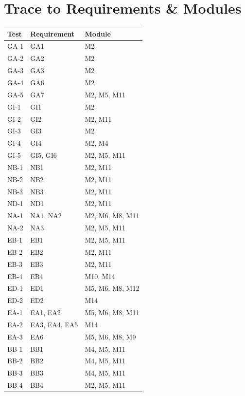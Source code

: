 \documentclass[12pt, titlepage]{article}
\begin{document}
\section{Trace to Requirements \& Modules}

\begin{longtable}{| p{} | p{} | p{}|}
  \hline
  Test & Requirement & Module\\
  \hline
  GA-1 & GA1 & M2\\
  \hline
  GA-2 & GA2 & M2\\
  \hline
  GA-3 & GA3 & M2\\
  \hline
  GA-4 & GA6 & M2\\
  \hline
  GA-5 & GA7 & M2, M5, M11\\
  \hline
  GI-1 & GI1 & M2\\
  \hline
  GI-2 & GI2 & M2, M11\\
  \hline
  GI-3 & GI3 & M2\\
  \hline
  GI-4 & GI4 & M2, M4\\
  \hline
  GI-5 & GI5, GI6 & M2, M5, M11\\
  \hline
  NB-1 & NB1 & M2, M11\\
  \hline
  NB-2 & NB2 & M2, M11\\
  \hline
  NB-3 & NB3 & M2, M11\\
  \hline
  ND-1 & ND1 & M2, M11\\
  \hline
  NA-1 & NA1, NA2 & M2, M6, M8, M11\\
  \hline
  NA-2 & NA3 & M2, M5, M11\\
  \hline
  EB-1 & EB1 & M2, M5, M11\\
  \hline
  EB-2 & EB2 & M2, M11\\
  \hline
  EB-3 & EB3 & M2, M11\\
  \hline
  EB-4 & EB4 & M10, M14\\
  \hline
  ED-1 & ED1 & M5, M6, M8, M12\\
  \hline
  ED-2 & ED2 & M14\\
  \hline
  EA-1 & EA1, EA2 & M5, M6, M8, M11\\
  \hline
  EA-2 & EA3, EA4, EA5 & M14\\
  \hline
  EA-3 & EA6 & M5, M6, M8, M9\\
  \hline
  BB-1 & BB1 & M4, M5, M11\\
  \hline
  BB-2 & BB2 & M4, M5, M11\\
  \hline
  BB-3 & BB3 & M4, M5, M11\\
  \hline
  BB-4 & BB4 & M2, M5, M11\\

\end{longtable}
\end{document}
